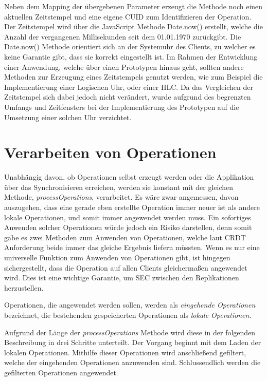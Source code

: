 \documentclass[a4paper, 12pt]{scrreprt}
\begin{document}
Neben dem Mapping der übergebenen Parameter erzeugt die Methode noch einen aktuellen Zeitstempel und eine eigene CUID zum Identifizieren der Operation. Der Zeitstempel wird über die JavaScript Methode Date.now() erstellt, welche die Anzahl der vergangenen Millisekunden seit dem 01.01.1970 zurückgibt. Die Date.now() Methode orientiert sich an der Systemuhr des Clients, zu welcher es keine Garantie gibt, dass sie korrekt eingestellt ist. Im Rahmen der Entwicklung einer Anwendung, welche über einen Prototypen hinaus geht, sollten andere Methoden zur Erzeugung eines Zeitstempels genutzt werden, wie zum Beispiel die Implementierung einer Logischen Uhr, oder einer \ac{HLC}. Da das Vergleichen der Zeitstempel sich dabei jedoch nicht verändert, wurde aufgrund des begrenzten Umfangs und Zeitfensters bei der Implementierung des Prototypen auf die Umsetzung einer solchen Uhr verzichtet.

\section{Verarbeiten von Operationen}
\label{sec:processOperations}

Unabhängig davon, ob Operationen selbst erzeugt werden oder die Applikation über das Synchronisieren erreichen, werden sie konstant mit der gleichen Methode, \textit{processOperations}, verarbeitet. Es wäre zwar angemessen, davon auszugehen, dass eine gerade eben erstellte Operation immer neuer ist als andere lokale Operationen, und somit immer angewendet werden muss. Ein sofortiges Anwenden solcher Operationen würde jedoch ein Risiko darstellen, denn somit gäbe es zwei Methoden zum Anwenden von Operationen, welche laut CRDT Anforderung beide immer das gleiche Ergebnis liefern müssten. Wenn es nur eine universelle Funktion zum Anwenden von Operationen gibt, ist hingegen sichergestellt, dass die Operation auf allen Clients gleichermaßen angewendet wird. Dies ist eine wichtige Garantie, um \ac{SEC} zwischen den Replikationen herzustellen.

Operationen, die angewendet werden sollen, werden als \textit{eingehende Operationen} bezeichnet, die bestehenden gespeicherten Operationen als \textit{lokale Operationen}.

Aufgrund der Länge der \textit{processOperations} Methode wird diese in der folgenden Beschreibung in drei Schritte unterteilt. Der Vorgang beginnt mit dem Laden der lokalen Operationen. Mithilfe dieser Operationen wird anschließend gefiltert, welche der eingehenden Operationen anzuwenden sind. Schlussendlich werden die gefilterten Operationen angewendet.
\end{document}
